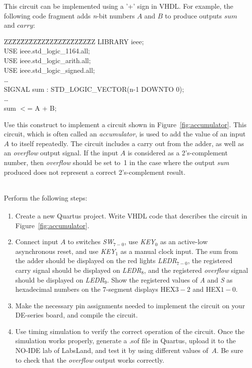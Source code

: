 \documentclass[epsfig,10pt,fullpage]{article}
\begin{document}
This circuit can be implemented using a '+' sign in VHDL. For example, the following code fragment adds {\it n}-bit numbers $A$ and $B$ to produce outputs $sum$ and $carry$:

\begin{center}
\begin{minipage}[t]{12.5 cm}
\begin{tabbing}
ZZ\=ZZ\=ZZ\=ZZ\=ZZ\=ZZ\=ZZ\=ZZ\=ZZ\=ZZ\=ZZ\kill
\>LIBRARY ieee;\\
\>USE ieee.std\_logic\_1164.all;\\
\>USE ieee.std\_logic\_arith.all;\\
\>USE ieee.std\_logic\_signed.all;\\
\>\ldots \\
\>SIGNAL sum : STD\_LOGIC\_VECTOR(n-1 DOWNTO 0);\\
\>\ldots \\
\>sum $<$= A + B;\\
\end{tabbing}
\end{minipage}
\end{center}

Use this construct to implement a circuit shown in Figure~\ref{fig:accumulator}. This
circuit, which is often called an {\it accumulator}, is used to add the value of an input
$A$ to itself repeatedly. The circuit includes a carry out from the adder, as well as an
{\it overflow} output signal. If the input $A$ is considered as a 2's-complement number, 
then {\it overflow} should be set to~1
in the case where the output {\it sum} produced does not represent a correct
2's-complement result.

~\\
Perform the following steps:
\begin{enumerate}
\item Create a new Quartus\textsuperscript{\textregistered} project. Write VHDL code that describes the 
circuit in Figure~\ref{fig:accumulator}.
\item Connect input $A$ to switches {\it SW}$_{7-0}$, use {\it KEY}$_0$ as an 
active-low asynchronous reset, and use {\it KEY}$_1$ as a manual clock input. The sum 
from the adder should be displayed on the red lights {\it LEDR}$_{7-0}$, the registered 
carry signal should be displayed on {\it LEDR}$_{8}$, and the registered {\it overflow} 
signal should be displayed on {\it LEDR}$_{9}$. Show the registered values of {\it A}
and {\it S} as hexadecimal numbers on the 7-segment displays HEX$3-2$ and HEX$1-0$. 
\item Make the necessary pin assignments needed to implement the circuit on your
DE-series board, and compile the circuit.
\item Use timing simulation to verify the correct operation of the
circuit. Once the simulation works properly, generate a .sof file in Quartus, upload it to the NO-IDE lab of LabsLand, 
and test it by using different values of~$A$. Be sure to check that the {\it overflow} 
output works correctly.
\end{enumerate}
\end{document}
